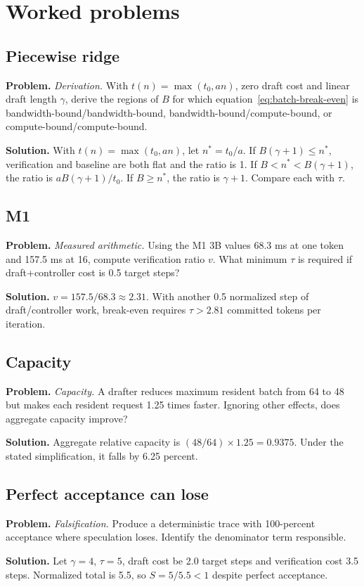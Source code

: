 \section{Worked problems}

\subsection{Piecewise ridge}
\textbf{Problem.} \emph{Derivation.} With $t(n)=\max(t_0,an)$, zero draft cost and linear draft
length $\gamma$, derive the regions of $B$ for which equation~\eqref{eq:batch-break-even}
is bandwidth-bound/bandwidth-bound, bandwidth-bound/compute-bound, or
compute-bound/compute-bound.

\textbf{Solution.} With $t(n)=\max(t_0,an)$, let $n^*=t_0/a$.
If $B(\gamma+1)\le n^*$, verification and baseline are both flat and the ratio is 1.
If $B<n^*<B(\gamma+1)$, the ratio is $aB(\gamma+1)/t_0$.
If $B\ge n^*$, the ratio is $\gamma+1$. Compare each with $\tau$.

\subsection{M1}
\textbf{Problem.} \emph{Measured arithmetic.} Using the M1 3B values 68.3 ms at one token and
157.5 ms at 16, compute verification ratio $v$. What minimum $\tau$ is required if
draft+controller cost is 0.5 target steps?

\textbf{Solution.} $v=157.5/68.3\approx2.31$. With another 0.5 normalized step of
draft/controller work, break-even requires $\tau>2.81$ committed tokens per iteration.

\subsection{Capacity}
\textbf{Problem.} \emph{Capacity.} A drafter reduces maximum resident batch from 64 to 48 but makes
each resident request 1.25 times faster. Ignoring other effects, does aggregate capacity
improve?

\textbf{Solution.} Aggregate relative capacity is $(48/64)\times1.25=0.9375$.
Under the stated simplification, it falls by 6.25 percent.

\subsection{Perfect acceptance can lose}
\textbf{Problem.} \emph{Falsification.} Produce a deterministic trace with 100-percent acceptance
where speculation loses. Identify the denominator term responsible.

\textbf{Solution.} Let $\gamma=4$, $\tau=5$, draft cost be 2.0
target steps and verification cost 3.5 steps. Normalized total is 5.5, so
$S=5/5.5<1$ despite perfect acceptance.
